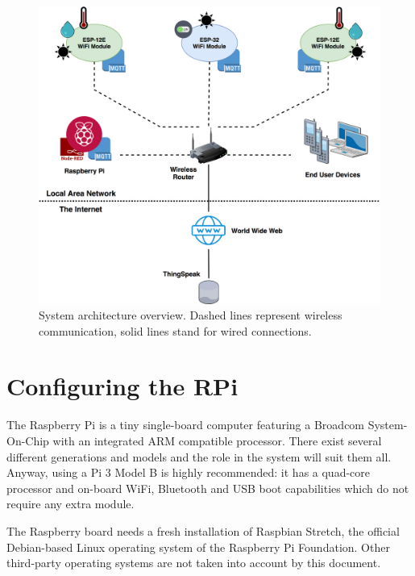 \begin{figure}[H]
	\begin{center}
		\includegraphics[width=\textwidth]{./pictures/architecture_overview.png}
		\caption{System architecture overview. Dashed lines represent wireless communication, solid lines stand for wired connections.}
		\label{architecture_overview}
	\end{center}
\end{figure}

\section{Configuring the RPi}
The Raspberry Pi is a tiny single-board computer featuring a Broadcom System-On-Chip with an integrated ARM compatible processor. There exist several different generations and models and the role in the system will suit them all. Anyway, using a Pi 3 Model B is highly recommended: it has a quad-core processor and on-board WiFi, Bluetooth and USB boot capabilities which do not require any extra module.

The Raspberry board needs a fresh installation of Raspbian Stretch, the official Debian-based Linux operating system of the Raspberry Pi Foundation. Other third-party operating systems are not taken into account by this document.

